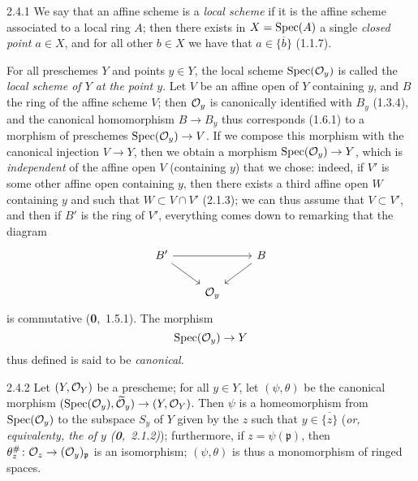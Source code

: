 \documentclass[../main.tex]{subfiles}
\begin{document}
    \begin{env}{2.4.1}
        We say that an affine scheme is a \emph{local scheme} if it is the affine scheme associated to a local ring $A$; then there exists in $X=\operatorname{Spec}(A)$ a single \emph{closed point $a\in X$}, and for all other $b\in X$ we have that $a\in\overline{\{b\}}$ (1.1.7).
    \end{env}
    
    For all preschemes $Y$ and points $y\in Y$, the local scheme $\operatorname{Spec}(\mathcal{O}_y)$ is called the \emph{local scheme of $Y$ at the point $y$}.
    Let $V$ be an affine open of $Y$ containing $y$, and $B$ the ring of the affine scheme $V$; then $\mathcal{O}_y$ is canonically identified with $B_y$ (1.3.4), and the canonical homomorphism $B\to B_y$ thus corresponds (1.6.1) to a morphism of preschemes $\operatorname{Spec}(\mathcal{O}_y)\to V$.
    If we compose this morphism with the canonical injection $V\to Y$, then we obtain a morphism $\operatorname{Spec}(\mathcal{O}_y)\to Y$, which is \emph{independent} of the affine open $V$ (containing $y$) that we chose: indeed, if $V'$ is some other affine open containing $y$, then there exists a third affine open $W$ containing $y$ and such that $W\subset V\cap V'$ (2.1.3); we can thus assume that $V\subset V'$, and then if $B'$ is the ring of $V'$, everything comes down to remarking that the diagram
    \begin{equation*}
        \begin{tikzcd}
            B'\arrow[rr]\arrow[dr]&&B\arrow[dl]\\
            &\O_y&
        \end{tikzcd}
    \end{equation*}
    is commutative (\textbf{0},~1.5.1).
    The morphism
    \begin{equation*}
        \operatorname{Spec}(\mathcal{O}_y)\to Y
    \end{equation*}
    thus defined is said to be \emph{canonical}.
    
    \begin{env}[Proposition]{2.4.2}
        Let $(Y,\mathcal{O}_Y)$ be a prescheme; for all $y\in Y$, let $(\psi,\theta)$ be the canonical morphism $(\operatorname{Spec}(\mathcal{O}_y),\widetilde{\mathcal{O}}_y)\to(Y,\mathcal{O}_Y)$.
        Then $\psi$ is a homeomorphism from $\operatorname{Spec}(\mathcal{O}_y)$ to the subspace $S_y$ of $Y$ given by the $z$ such that $y\in\overline{\{z\}}$ (\emph{or, equivalenty, the \emph{} of $y$ (\textbf{0},~2.1.2)}); furthermore, if $z=\psi(\mathfrak{p})$, then $\theta_z^\#\colon\mathcal{O}_z\to(\mathcal{O}_y)_\mathfrak{p}$ is an isomorphism; $(\psi,\theta)$ is thus a monomorphism of ringed spaces.
    \end{env}
    
\end{document}
